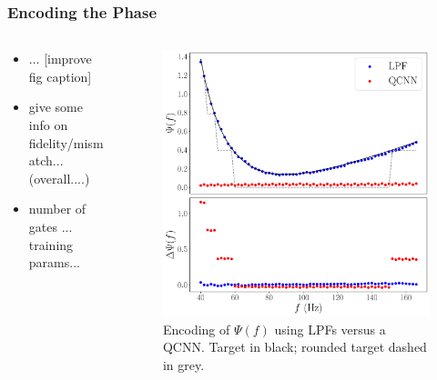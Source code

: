 \documentclass{beamer}
\begin{document}
\begin{frame}
\frametitle{Encoding the Phase}
\begin{columns}
\begin{column}{0.5\textwidth}
\begin{itemize}
\item ... [improve fig caption]
\item give some info on fidelity/mismatch... (overall....)
\item number of gates ... training params...
\end{itemize}
\end{column}
\begin{column}{0.5\textwidth}  
\begin{figure}[h]
\centering
\includegraphics[width=\textwidth]{im/phase_comp}
\caption{Encoding of $\Psi(f)$ using LPFs versus a QCNN. Target in black; rounded target dashed in grey.}
\end{figure}
\end{column}
\end{columns}
\end{frame}
\end{document}
